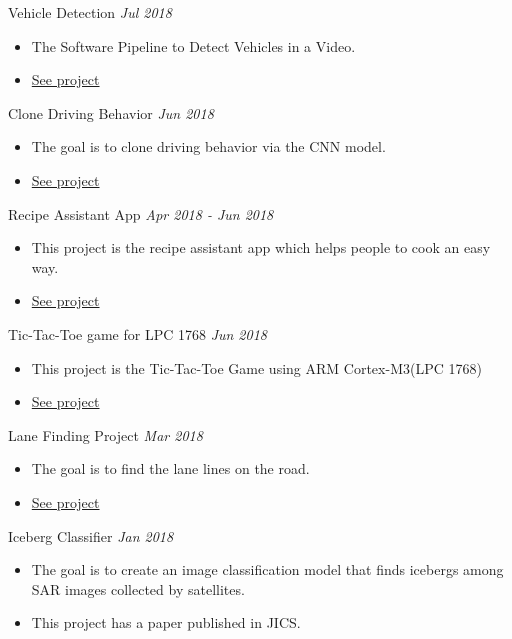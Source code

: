 \documentclass[10pt]{article}
\newenvironment{changemargin}[2]{
  \begin{list}{}{
    \setlength{\topsep}{0pt}
    \setlength{\leftmargin}{#1}
    \setlength{\rightmargin}{#2}
    \setlength{\listparindent}{\parindent}
    \setlength{\itemindent}{\parindent}
    \setlength{\parsep}{\parskip}
  }
  \item[]}{\end{list}
}
\newcommand{\project}[2]{
	{#1} \hfill \emph{#2}\\ \medskip
}
\newenvironment{body} {
	\vspace*{-16pt}
	\begin{changemargin}{-0.25in}{-0.5in}
  }
	{\end{changemargin}
}
\begin{document}
\begin{body}
\begin{itemize}
  	\end{itemize}
\project{Vehicle Detection}{Jul 2018}
\begin{itemize} \itemsep -0pt  %
      \item  The Software Pipeline to Detect Vehicles in a Video.
      \item \href{https://github.com/jeongwhanchoi/CarND-Vehicle-Detection}{See project}
  	\end{itemize}
\project{Clone Driving  Behavior}{Jun 2018}
\begin{itemize} \itemsep -0pt  %
      \item  The goal is to clone driving behavior via the CNN model.
      \item \href{https://github.com/jeongwhanchoi/CarND-Behavioral-Cloning}{See project}
  	\end{itemize}
\project{Recipe Assistant App}{Apr 2018 - Jun 2018}
\begin{itemize} \itemsep -0pt  %
      \item  This project is the recipe assistant app which helps people to cook an easy way.
      \item \href{https://github.com/jeongwhanchoi/recipe-assistant-app}{See project}
  	\end{itemize}
\project{Tic-Tac-Toe game for LPC 1768}{Jun 2018}
\begin{itemize} \itemsep -0pt  %
      \item  This project is the Tic-Tac-Toe Game using ARM Cortex-M3(LPC 1768)
      \item \href{https://github.com/jeongwhanchoi/tic-tac-toe-lpc1768}{See project}
  	\end{itemize}
\project{Lane Finding Project}{Mar 2018}
\begin{itemize} \itemsep -0pt  %
      \item  The goal is to find the lane lines on the road.
      \item \href{https://github.com/jeongwhanchoi/CarND-LaneLines}{See project}
  	\end{itemize}
\project{Iceberg Classifier}{Jan 2018}
\begin{itemize} \itemsep -0pt  %
      \item  The goal is to create an image classification model that finds icebergs among SAR images collected by satellites.
      \item This project has a paper published in JICS.

\end{itemize}
\end{body}
\end{document}
